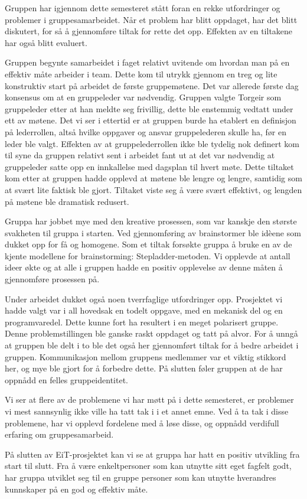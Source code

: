 Gruppen har igjennom dette semesteret stått foran en rekke utfordringer og problemer i gruppesamarbeidet.
Når et problem har blitt oppdaget, har det blitt diskutert, for så å gjennomføre tiltak for rette det opp.
Effekten av en tiltakene har også blitt evaluert.

Gruppen begynte samarbeidet i faget relativt uvitende om hvordan man på en effektiv måte arbeider i team.
Dette kom til utrykk gjennom en treg og lite konstruktiv start på arbeidet de første gruppemøtene.
Det var allerede første dag konsensus om at en gruppeleder var nødvendig.
Gruppen valgte Torgeir som gruppeleder etter at han meldte seg frivillig, dette ble enstemmig vedtatt under ett av møtene.
Det vi ser i ettertid er at gruppen burde ha etablert en definisjon på lederrollen, 
altså hvilke oppgaver og ansvar gruppelederen skulle ha, før en leder ble valgt.
Effekten av at gruppelederrollen ikke ble tydelig nok definert kom til syne da gruppen relativt sent i arbeidet fant ut at det var nødvendig at 
gruppeleder satte opp en innkallelse med dagsplan til hvert møte.
Dette tiltaket kom etter at gruppen hadde opplevd at møtene ble lengre og lengre, samtidig som at svært lite faktisk ble gjort.
Tiltaket viste seg å være svært effektivt, og lengden på møtene ble dramatisk redusert.

Gruppa har jobbet mye med den kreative prosessen, som var kanskje den største svakheten til gruppa i starten.
Ved gjennomføring av brainstormer ble idèene som dukket opp for få og homogene.
Som et tiltak forsøkte gruppa å bruke en av de kjente modellene for brainstorming: Stepladder-metoden.
Vi opplevde at antall ideer økte og at alle i gruppen hadde en positiv opplevelse av denne måten å gjennomføre prosessen på.

Under arbeidet dukket også noen tverrfaglige utfordringer opp.
Prosjektet vi hadde valgt var i all hovedsak en todelt oppgave, med en mekanisk del og en programvaredel.
Dette kunne fort ha resultert i en meget polarisert gruppe.
Denne problemstillingen ble ganske raskt oppdaget og tatt på alvor.
For å unngå at gruppen ble delt i to ble det også her gjennomført tiltak for å bedre arbeidet i gruppen. 
Kommunikasjon mellom gruppens medlemmer var et viktig stikkord her, og mye ble gjort for å forbedre dette.
På slutten føler gruppen at de har oppnådd en felles gruppeidentitet.

Vi ser at flere av de problemene vi har møtt på i dette semesteret,
er problemer vi mest sannsynlig ikke ville ha tatt tak i i et annet emne.
Ved å ta tak i disse problemene, har vi opplevd fordelene med å løse disse,
og oppnådd verdifull erfaring om gruppesamarbeid.

På slutten av EiT-prosjektet kan vi se at gruppa har hatt en positiv utvikling fra start til slutt.
Fra å være enkeltpersoner som kan utnytte sitt eget fagfelt godt,
har gruppa utviklet seg til en gruppe personer som kan utnytte hverandres kunnskaper på en god og effektiv måte.
